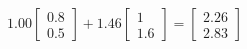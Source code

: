 \documentclass[preview]{standalone}
\begin{document}
\begin{align*}
1.00 \begin{bmatrix} 0.8 \\ 0.5 \end{bmatrix} + 1.46 \begin{bmatrix} 1 \\ 1.6 \end{bmatrix} = \begin{bmatrix} 2.26 \\ 2.83 \end{bmatrix}
\end{align*}
\end{document}
